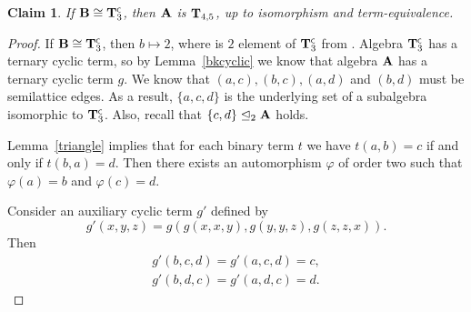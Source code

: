 \documentclass[11pt]{amsart}
\newcommand{\m}[1]{\mathbf{\uppercase{#1}}}
\newcommand{\co}{\scriptscriptstyle{\mathsf{C}}}
\theoremstyle{definition}
\theoremstyle{remark}
\theoremstyle{plain}
\newtheorem{claim}[thm]{Claim}
\begin{document}
\begin{claim}
If ${\m B}\cong {\m T}_3^{\co}$, then ${\m A}$ is $ {\m T}_{4,5}$, up to isomorphism and term-equivalence.
\end{claim}
\begin{proof}
If ${\m B}\cong {\m T}_3^{\co}$, then $b\mapsto 2$, where is $2$ element of ${\m T}_3^{\co}$ from . Algebra ${\m T}_3^{\co}$ has a ternary cyclic term, so by Lemma~\ref{bkcyclic} we know that algebra $\m A$ has a ternary cyclic term $g$. We know that $(a,c), (b,c), (a,d)$ and $(b,d)$ must be semilattice edges. As a result, $\{a,c,d\}$ is the underlying set of a subalgebra isomorphic to ${\m T}_3^{\co}$. Also, recall that $\{c,d\}\trianglelefteq_2 {\m A}$ holds.

Lemma~\ref{triangle} implies that for each binary term $t$ we have $t(a,b)=c$ if and only if $t(b,a)=d$. Then there exists an automorphism $\varphi$ of order two such that $\varphi (a)=b$ and $\varphi (c)=d$.

Consider an auxiliary cyclic term $g'$ defined by $$g'(x,y,z)=g(g(x,x,y),g(y,y,z),g(z,z,x)).$$ Then 
\begin{gather*}
    g'(b,c,d)=g'(a,c,d)=c,\\
    g'(b,d,c)=g'(a,d,c)=d.
\end{gather*}




\end{proof}
\end{document}
